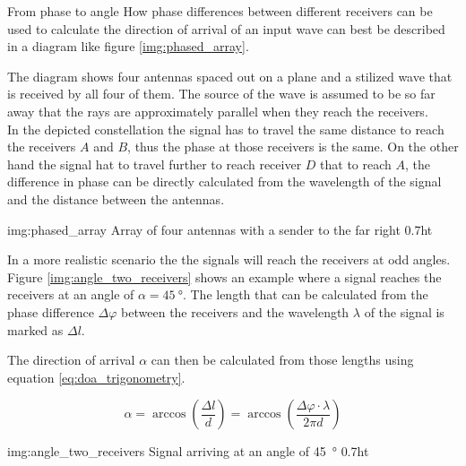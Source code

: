 \begin{subchapter}{From phase to angle}
  How phase differences between different receivers
  can be used to calculate the direction of arrival of an
  input wave can best be described in a diagram like
  figure \ref{img:phased_array}.

  The diagram shows four antennas spaced out on a plane
  and a stilized wave that is received by all four of them.
  The source of the wave is assumed to be so far away that
  the rays are approximately parallel when they reach the receivers. \\

  In the depicted constellation the signal has to travel the
  same distance to reach the receivers $A$ and $B$, thus the
  phase at those receivers is the same.
  On the other hand the signal hat to travel further to reach
  receiver $D$ that to reach $A$, the difference in phase can
  be directly calculated from the wavelength of the signal and
  the distance between the antennas.

               {img:phased_array}
               {Array of four antennas with a sender to the far right}
               {0.7}{ht}

  In a more realistic scenario the the signals will reach the
  receivers at odd angles. Figure \ref{img:angle_two_receivers}
  shows an example where a signal reaches the receivers at an
  angle of $\alpha=\SI{45}{\degree}$. The length that can be calculated
  from the phase difference $\Delta \varphi$ between the receivers and
  the wavelength $\lambda$ of the signal is marked as $\Delta l$.

  The direction of arrival $\alpha$ can then be calculated from
  those lengths using equation \ref{eq:doa_trigonometry}.

  \begin{equation}
    \label{eq:doa_trigonometry}
    \alpha
    = \arccos \left( \frac{\Delta l}{d} \right)
    = \arccos \left( \frac{\Delta \varphi \cdot \lambda}{2 \pi d} \right)
  \end{equation}

               {img:angle_two_receivers}
               {Signal arriving at an angle of \SI{45}{\degree}}
               {0.7}{ht}
\end{subchapter}

